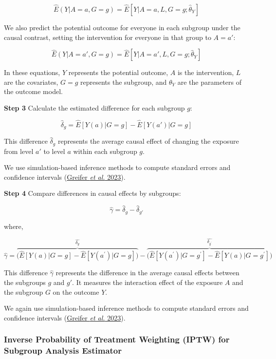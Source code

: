 \documentclass[
  singlecolumn]{article}
\begin{document}
\[\hat{E}(Y|A=a, G=g)  = \hat{E}[Y|A=a,L,G=g; \hat{\theta}_Y]\]

We also predict the potential outcome for everyone in each subgroup
under the causal contrast, setting the intervention for everyone in that
group to \(A=a'\):

\[\hat{E}(Y|A=a', G=g)  = \hat{E}[Y|A=a',L,G=g; \hat{\theta}_Y]\]

In these equations, \(Y\) represents the potential outcome, \(A\) is the
intervention, \(L\) are the covariates, \(G=g\) represents the subgroup,
and \(\theta_Y\) are the parameters of the outcome model.

\textbf{Step 3} Calculate the estimated difference for each subgroup
\(g\):

\[\hat{\delta}_g = \hat{E}[Y(a)|G=g] - \hat{E}[Y(a')|G=g]\]

This difference \(\hat{\delta}_g\) represents the average causal effect
of changing the exposure from level \(a'\) to level \(a\) within each
subgroup \(g\).

We use simulation-based inference methods to compute standard errors and
confidence intervals (\protect\hyperlink{ref-greifer2023}{Greifer
\emph{et al.} 2023}).

\textbf{Step 4} Compare differences in causal effects by subgroups:

\[\hat{\gamma} = \hat{\delta}_g - \hat{\delta}_{g'}\]

where,

\[\hat{\gamma} = \overbrace{\big( \hat{E}[Y(a)|G=g] - \hat{E}[Y(a^{\prime})|G=g] \big)}^{\hat{\delta_g}} - \overbrace{\big(\hat{E}[Y(a^{\prime})|G=g^{\prime}]- \hat{E}[Y(a)|G=g^{\prime}]\big)}^{\hat{\delta_{g^{\prime}}}}\]

This difference \(\hat{\gamma}\) represents the difference in the
average causal effects between the subgroups \(g\) and \(g'\). It
measures the interaction effect of the exposure \(A\) and the subgroup
\(G\) on the outcome \(Y\).

We again use simulation-based inference methods to compute standard
errors and confidence intervals
(\protect\hyperlink{ref-greifer2023}{Greifer \emph{et al.} 2023}).

\hypertarget{inverse-probability-of-treatment-weighting-iptw-for-subgroup-analysis-estimator}{%
\subsubsection{\texorpdfstring{\textbf{Inverse Probability of Treatment
Weighting (IPTW) for Subgroup Analysis
Estimator}}{Inverse Probability of Treatment Weighting (IPTW) for Subgroup Analysis Estimator}}\label{inverse-probability-of-treatment-weighting-iptw-for-subgroup-analysis-estimator}}
\end{document}

